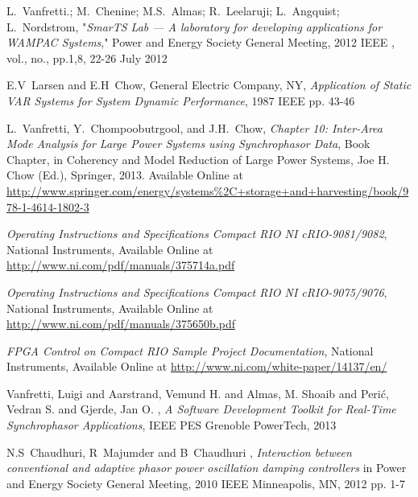 \documentclass[journal]{IEEEtran}
\begin{document}
\begin{thebibliography}{1}
 L.~Vanfretti.; M.~Chenine; M.S.~Almas; R.~Leelaruji; L.~Angquist; L.~Nordstrom, "\emph{SmarTS Lab — A laboratory for developing applications for WAMPAC Systems}," Power and Energy Society General Meeting, 2012 IEEE , vol., no., pp.1,8, 22-26 July 2012

 E.V~Larsen and E.H~Chow, General Electric Company, NY, \emph{Application of Static VAR Systems for System Dynamic Performance}, 1987 IEEE pp. 43-46

  L.~Vanfretti, Y.~Chompoobutrgool, and J.H.~Chow, \emph{Chapter 10: Inter-Area Mode Analysis for Large Power Systems using Synchrophasor Data}, Book Chapter, in Coherency and Model Reduction of Large Power Systems, Joe H. Chow (Ed.), Springer, 2013. Available Online at \url{http://www.springer.com/energy/systems%2C+storage+and+harvesting/book/978-1-4614-1802-3}

 \emph{Operating Instructions and Specifications Compact RIO NI cRIO-9081/9082}, National Instruments, Available Online at \url{http://www.ni.com/pdf/manuals/375714a.pdf}
  
 \emph{Operating Instructions and Specifications Compact RIO NI cRIO-9075/9076}, National Instruments, Available Online at \url{http://www.ni.com/pdf/manuals/375650b.pdf}

 \emph{FPGA Control on Compact RIO Sample Project Documentation}, National Instruments, Available Online at \url{http://www.ni.com/white-paper/14137/en/}

 Vanfretti, Luigi and Aarstrand, Vemund H. and Almas, M. Shoaib and Peri\'c, Vedran S. and Gjerde, Jan O. , \emph{A Software Development Toolkit for Real-Time Synchrophasor Applications},  IEEE PES Grenoble PowerTech, 2013

 N.S~Chaudhuri, R~Majumder and B~Chaudhuri , \emph{Interaction between conventional and adaptive phasor power oscillation damping controllers} in Power and Energy Society General Meeting, 2010 IEEE Minneapolis, MN, 2012 pp. 1-7

\end{thebibliography}

% 
\end{document}
